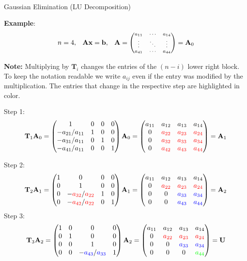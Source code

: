 \documentclass[11pt,compress,t,notes=noshow, xcolor=table]{beamer}
\begin{document}
\begin{vbframe}{Gaussian Elimination (LU Decomposition)}
\begin{enumerate}
\framebreak

\textbf{Example}:
$$ \scriptsize
n = 4, \quad \mathbf{Ax} = \mathbf{b}, \quad \mathbf{A} = \begin{pmatrix} 
a_{11} & \cdots & a_{14} \\
\vdots & \ddots & \vdots \\
a_{41} & \cdots & a_{44}  \end{pmatrix}
= \mathbf{A}_0
$$

\footnotesize{
\textbf{Note:} Multiplying by $\mathbf{T}_i$ changes the entries of the $(n - i)$ lower right block. To keep the notation readable we write $a_{ij}$ even if the entry was modified by the multiplication. The entries that change in the respective step are highlighted in color. }

\lz

\normalsize
Step 1: \scriptsize
$$
\mathbf{T}_1 \mathbf{A}_0 = \begin{pmatrix} 
1                & 0 & 0 & 0 \\
-a_{21} / a_{11} & 1 & 0 & 0 \\
-a_{31} / a_{11} & 0 & 1 & 0 \\
-a_{41} / a_{11} & 0 & 0 & 1  \end{pmatrix}
\mathbf{A}_0 =
\begin{pmatrix} 
a_{11} & a_{12} & a_{13} & a_{14} \\
0      & \textcolor{red}{a_{22}} & \textcolor{red}{a_{23}} & \textcolor{red}{a_{24}} \\
0      & \textcolor{red}{a_{32}} & \textcolor{red}{a_{33}} & \textcolor{red}{a_{34}} \\
0      & \textcolor{red}{a_{42}} & \textcolor{red}{a_{43}} & \textcolor{red}{a_{44}}  \end{pmatrix}
= \mathbf{A}_1
$$

\normalsize

\framebreak

Step 2: \scriptsize
$$
\mathbf{T}_2 \mathbf{A}_1 = \begin{pmatrix} 
1 & 0                & 0 & 0 \\
0 & 1                & 0 & 0 \\
0 & -\textcolor{red}{a_{32}} / \textcolor{red}{a_{22}} & 1 & 0 \\
0 & -\textcolor{red}{a_{42}} / \textcolor{red}{a_{22}} & 0 & 1  \end{pmatrix}
\mathbf{A}_1 =
\begin{pmatrix} 
a_{11} & a_{12} & a_{13} & a_{14} \\
0      & \textcolor{red}{a_{22}} & \textcolor{red}{a_{23}} & \textcolor{red}{a_{24}} \\
0      & 0      & \textcolor{blue}{a_{33}} & \textcolor{blue}{a_{34}} \\
0      & 0      & \textcolor{blue}{a_{43}} & \textcolor{blue}{a_{44}}  \end{pmatrix}
= \mathbf{A}_2
$$ \normalsize
Step 3: \scriptsize
$$
\mathbf{T}_3 \mathbf{A}_2 = \begin{pmatrix} 
1 & 0 & 0                & 0 \\
0 & 1 & 0                & 0 \\
0 & 0 & 1                & 0 \\
0 & 0 & -\textcolor{blue}{a_{43}} / \textcolor{blue}{a_{33}} & 1  \end{pmatrix}
\mathbf{A}_2 =
\begin{pmatrix} 
a_{11} & a_{12} & a_{13} & a_{14} \\
0      & \textcolor{red}{a_{22}} & \textcolor{red}{a_{23}} & \textcolor{red}{a_{24}} \\
0      & 0      & \textcolor{blue}{a_{33}} & \textcolor{blue}{a_{34}} \\
0      & 0      & 0      & \textcolor{green}{a_{44}}  \end{pmatrix} = \mathbf{U}
$$


\end{enumerate}
\end{vbframe}
\end{document}
